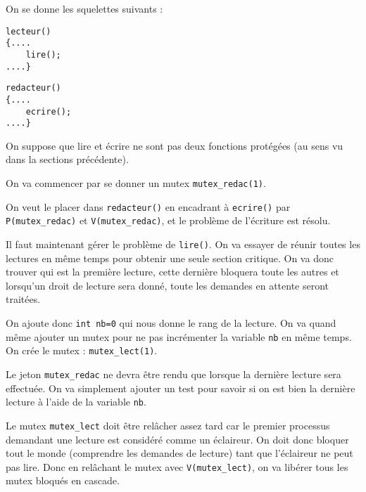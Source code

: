 \documentclass[12pt,a4paper]{report}
\begin{document}
On se donne les squelettes suivants :

\medskip

\begin{minipage}{0.5\linewidth}
\begin{verbatim}
lecteur()
{....
    lire();
....}
\end{verbatim}
\end{minipage}
\begin{minipage}{0.5\linewidth}
\begin{verbatim}
redacteur()
{....
    ecrire();
....}
\end{verbatim}
\end{minipage}

\medskip

On suppose que lire et écrire ne sont pas deux fonctions protégées (au sens vu dans la sections précédente).

\bigskip

On va commencer par se donner un mutex \verb?mutex_redac(1)?.

On veut le placer dans \verb?redacteur()? en encadrant à \verb?ecrire()? par \verb?P(mutex_redac)? et \verb?V(mutex_redac)?, et le problème de l'écriture est résolu.

Il faut maintenant gérer le problème de \verb?lire()?. On va essayer de réunir toutes les lectures en même temps pour obtenir \og une seule section critique\fg{}. On va donc trouver qui est la première lecture, cette dernière bloquera toute les autres et lorsqu'un droit de lecture sera donné, toute les demandes en attente seront traitées.

On ajoute donc \verb?int nb=0? qui nous donne le rang de la lecture. On va quand même ajouter un mutex pour ne pas incrémenter la variable \verb?nb? en même temps. On crée le mutex : \verb?mutex_lect(1)?.


Le jeton \verb?mutex_redac? ne devra être rendu que lorsque la dernière lecture sera effectuée. On va simplement ajouter un test pour savoir si on est bien la dernière lecture à l'aide de la variable \verb?nb?.

\medskip

Le mutex \verb?mutex_lect? doit être relâcher assez tard car le premier processus demandant une lecture est considéré comme un éclaireur. On doit donc bloquer \og tout le monde\fg{} (comprendre les demandes de lecture) tant que l'éclaireur ne peut pas lire. Donc en relâchant le mutex avec \verb?V(mutex_lect)?, on va libérer tous les mutex bloqués en cascade.
\end{document}
